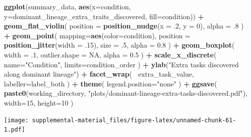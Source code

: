 \documentclass[]{book}
\newenvironment{Shaded}{\begin{snugshade}}{\end{snugshade}}
\newcommand{\DataTypeTok}[1]{\textcolor[rgb]{0.13,0.29,0.53}{#1}}
\newcommand{\DecValTok}[1]{\textcolor[rgb]{0.00,0.00,0.81}{#1}}
\newcommand{\FloatTok}[1]{\textcolor[rgb]{0.00,0.00,0.81}{#1}}
\newcommand{\KeywordTok}[1]{\textcolor[rgb]{0.13,0.29,0.53}{\textbf{#1}}}
\newcommand{\NormalTok}[1]{#1}
\newcommand{\OperatorTok}[1]{\textcolor[rgb]{0.81,0.36,0.00}{\textbf{#1}}}
\newcommand{\OtherTok}[1]{\textcolor[rgb]{0.56,0.35,0.01}{#1}}
\newcommand{\StringTok}[1]{\textcolor[rgb]{0.31,0.60,0.02}{#1}}
\begin{document}
\begin{Shaded}
\begin{Highlighting}[]
\KeywordTok{ggplot}\NormalTok{(summary_data, }\KeywordTok{aes}\NormalTok{(}\DataTypeTok{x=}\NormalTok{condition, }\DataTypeTok{y=}\NormalTok{dominant_lineage_extra_traits_discovered, }\DataTypeTok{fill=}\NormalTok{condition)) }\OperatorTok{+}
\StringTok{  }\KeywordTok{geom_flat_violin}\NormalTok{(}
    \DataTypeTok{position =} \KeywordTok{position_nudge}\NormalTok{(}\DataTypeTok{x =} \FloatTok{.2}\NormalTok{, }\DataTypeTok{y =} \DecValTok{0}\NormalTok{),}
    \DataTypeTok{alpha =} \FloatTok{.8}
\NormalTok{  ) }\OperatorTok{+}
\StringTok{  }\KeywordTok{geom_point}\NormalTok{(}
    \DataTypeTok{mapping=}\KeywordTok{aes}\NormalTok{(}\DataTypeTok{color=}\NormalTok{condition),}
    \DataTypeTok{position =} \KeywordTok{position_jitter}\NormalTok{(}\DataTypeTok{width =} \FloatTok{.15}\NormalTok{),}
    \DataTypeTok{size =} \FloatTok{.5}\NormalTok{,}
    \DataTypeTok{alpha =} \FloatTok{0.8}
\NormalTok{  ) }\OperatorTok{+}
\StringTok{  }\KeywordTok{geom_boxplot}\NormalTok{(}
    \DataTypeTok{width =} \FloatTok{.1}\NormalTok{,}
    \DataTypeTok{outlier.shape =} \OtherTok{NA}\NormalTok{,}
    \DataTypeTok{alpha =} \FloatTok{0.5}
\NormalTok{  ) }\OperatorTok{+}
\StringTok{  }\KeywordTok{scale_x_discrete}\NormalTok{(}
    \DataTypeTok{name=}\StringTok{"Condition"}\NormalTok{,}
    \DataTypeTok{limits=}\NormalTok{condition_order}
\NormalTok{  ) }\OperatorTok{+}
\StringTok{  }\KeywordTok{ylab}\NormalTok{(}\StringTok{"Extra tasks discovered along dominant lineage"}\NormalTok{) }\OperatorTok{+}
\StringTok{  }\KeywordTok{facet_wrap}\NormalTok{(}
    \OperatorTok{~}\NormalTok{extra_task_value,}
    \DataTypeTok{labeller=}\NormalTok{label_both}
\NormalTok{  ) }\OperatorTok{+}
\StringTok{  }\KeywordTok{theme}\NormalTok{(}
    \DataTypeTok{legend.position=}\StringTok{"none"}
\NormalTok{  ) }\OperatorTok{+}
\StringTok{  }\KeywordTok{ggsave}\NormalTok{(}
    \KeywordTok{paste0}\NormalTok{(working_directory, }\StringTok{"plots/dominant-lineage-extra-tasks-discovered.pdf"}\NormalTok{),}
    \DataTypeTok{width=}\DecValTok{15}\NormalTok{,}
    \DataTypeTok{height=}\DecValTok{10}
\NormalTok{  )}
\end{Highlighting}
\end{Shaded}

\texttt{[image: supplemental-material\_files/figure-latex/unnamed-chunk-61-1.pdf]}

\begin{Shaded}
\end{Shaded}
\end{document}
